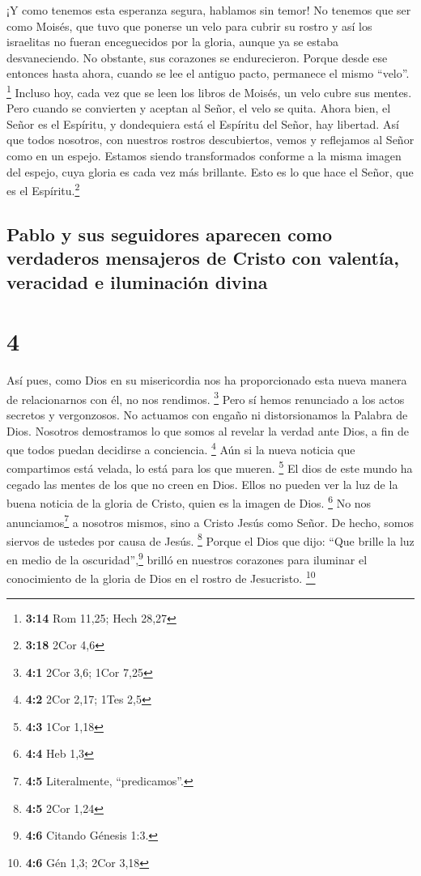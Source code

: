  ¡Y como tenemos esta esperanza segura, hablamos sin
temor!  No tenemos que ser como Moisés, que tuvo que
ponerse un velo para cubrir su rostro y así los israelitas no fueran
enceguecidos por la gloria, aunque ya se estaba desvaneciendo.
 No obstante, sus corazones se endurecieron. Porque desde
ese entonces hasta ahora, cuando se lee el antiguo pacto, permanece el
mismo ``velo''. \footnote{\textbf{3:14} Rom 11,25; Hech 28,27}
 Incluso hoy, cada vez que se leen los libros de Moisés,
un velo cubre sus mentes.  Pero cuando se convierten y
aceptan al Señor, el velo se quita.  Ahora bien, el Señor
es el Espíritu, y dondequiera está el Espíritu del Señor, hay libertad.
 Así que todos nosotros, con nuestros rostros
descubiertos, vemos y reflejamos al Señor como en un espejo. Estamos
siendo transformados conforme a la misma imagen del espejo, cuya gloria
es cada vez más brillante. Esto es lo que hace el Señor, que es el
Espíritu.\footnote{\textbf{3:18} 2Cor 4,6}

\hypertarget{pablo-y-sus-seguidores-aparecen-como-verdaderos-mensajeros-de-cristo-con-valentuxeda-veracidad-e-iluminaciuxf3n-divina}{%
\subsection{Pablo y sus seguidores aparecen como verdaderos mensajeros
de Cristo con valentía, veracidad e iluminación
divina}\label{pablo-y-sus-seguidores-aparecen-como-verdaderos-mensajeros-de-cristo-con-valentuxeda-veracidad-e-iluminaciuxf3n-divina}}

\hypertarget{section-3}{%
\section{4}\label{section-3}}

 Así pues, como Dios en su misericordia nos ha
proporcionado esta nueva manera de relacionarnos con él, no nos
rendimos. \footnote{\textbf{4:1} 2Cor 3,6; 1Cor 7,25} 
Pero sí hemos renunciado a los actos secretos y vergonzosos. No actuamos
con engaño ni distorsionamos la Palabra de Dios. Nosotros demostramos lo
que somos al revelar la verdad ante Dios, a fin de que todos puedan
decidirse a conciencia. \footnote{\textbf{4:2} 2Cor 2,17; 1Tes 2,5}
 Aún si la nueva noticia que compartimos está velada, lo
está para los que mueren. \footnote{\textbf{4:3} 1Cor 1,18}
 El dios de este mundo ha cegado las mentes de los que no
creen en Dios. Ellos no pueden ver la luz de la buena noticia de la
gloria de Cristo, quien es la imagen de Dios. \footnote{\textbf{4:4} Heb
  1,3}  No nos anunciamos\footnote{\textbf{4:5}
  Literalmente, ``predicamos''.} a nosotros mismos, sino a Cristo Jesús
como Señor. De hecho, somos siervos de ustedes por causa de Jesús.
\footnote{\textbf{4:5} 2Cor 1,24}  Porque el Dios que
dijo: ``Que brille la luz en medio de la oscuridad'',\footnote{\textbf{4:6}
  Citando Génesis 1:3.} brilló en nuestros corazones para iluminar el
conocimiento de la gloria de Dios en el rostro de Jesucristo.
\footnote{\textbf{4:6} Gén 1,3; 2Cor 3,18}

